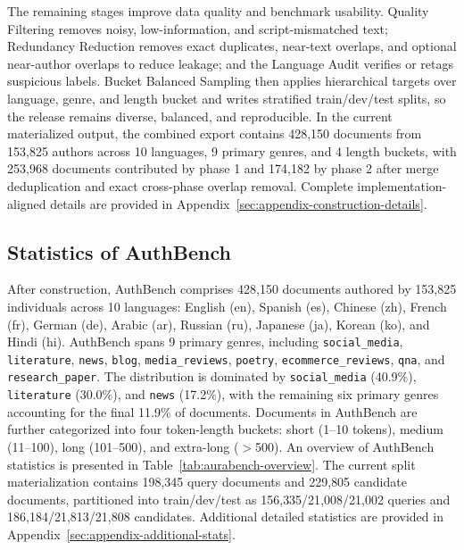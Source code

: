 \documentclass{article}
\newcommand{\rededit}[1]{{\color{editred}#1}}
\begin{document}
\rededit{The remaining stages improve data quality and benchmark usability. Quality Filtering removes noisy, low-information, and script-mismatched text; Redundancy Reduction removes exact duplicates, near-text overlaps, and optional near-author overlaps to reduce leakage; and the Language Audit verifies or retags suspicious labels. Bucket Balanced Sampling then applies hierarchical targets over language, genre, and length bucket and writes stratified train/dev/test splits, so the release remains diverse, balanced, and reproducible. In the current materialized output, the combined export contains 428{,}150 documents from 153{,}825 authors across 10 languages, 9 primary genres, and 4 length buckets, with 253{,}968 documents contributed by phase 1 and 174{,}182 by phase 2 after merge deduplication and exact cross-phase overlap removal. Complete implementation-aligned details are provided in Appendix~\ref{sec:appendix-construction-details}.}

\subsection{Statistics of AuthBench}
\label{sec:statbench}

After construction, AuthBench comprises \rededit{428{,}150 documents authored by 153{,}825 individuals} across 10 languages: English (en), Spanish (es), Chinese (zh), French (fr), German (de), Arabic (ar), Russian (ru), Japanese (ja), Korean (ko), and Hindi (hi). AuthBench spans \rededit{9 primary genres}, including \rededit{\texttt{social\_media}, \texttt{literature}, \texttt{news}, \texttt{blog}, \texttt{media\_reviews}, \texttt{poetry}, \texttt{ecommerce\_reviews}, \texttt{qna}, and \texttt{research\_paper}}. \rededit{The distribution is dominated by \texttt{social\_media} (40.9\%), \texttt{literature} (30.0\%), and \texttt{news} (17.2\%), with the remaining six primary genres accounting for the final 11.9\% of documents.} Documents in AuthBench are further categorized into four token-length buckets: short (1–10 tokens), medium (11–100), long (101–500), and extra-long ($>$500). An overview of AuthBench statistics is presented in Table~\ref{tab:aurabench-overview}. \rededit{The current split materialization contains 198{,}345 query documents and 229{,}805 candidate documents, partitioned into train/dev/test as 156{,}335/21{,}008/21{,}002 queries and 186{,}184/21{,}813/21{,}808 candidates.} Additional detailed statistics are provided in Appendix~\ref{sec:appendix-additional-stats}.
\end{document}
